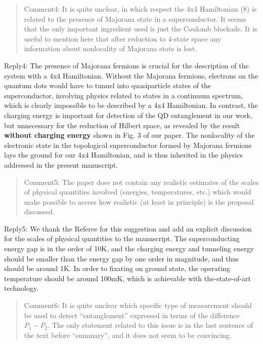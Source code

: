 \documentclass[11pt]{article}
\begin{document}
\begin{quote}
Comment4: It is quite unclear, in which respect the 4x4 Hamiltonian (8)
is related to the presence of Majorana state in a superconductor. It
seems that the only important ingredient used is just the Coulomb
blockade. It is useful to mention here that after reduction to 4-state
space any information about nonlocality of Majorana state is lost.
\end{quote}

Reply4: The presence of Majorana fermions is crucial for the description
of the system with a 4x4 Hamiltonian. Without the Majorana fermions,
electrons on the quantum dots would have to tunnel into quasiparticle
states of the superconductor, involving physics related to states in a
continuum spectrum, which is clearly impossible to be described by a 4x4
Hamiltonian. In contrast, the charging energy is important for detection
of the QD entanglement in our work, but unnecessary for the reduction of
Hilbert space, as revealed by the result
\textbf{without charging energy} shown in Fig. 3 of our paper. The
nonlocality of the electronic state in the topological superconductor
formed by Majorana fermions lays the ground for our 4x4 Hamiltonian, and
is thus inherited in the physics addressed in the present manuscript.

\begin{quote}
Comment5: The paper does not contain any realistic estimates of the
scales of physical quantities involved (energies, temperatures, etc.)
which would make possible to access how realistic (at least in
principle) is the proposal discussed.
\end{quote}

Reply5: We thank the Referee for this suggestion and add an explicit
discussion for the scales of physical quantities to the manuscript. The
superconducting energy gap is in the order of 10K, and the charging
energy and tunneling energy should be smaller than the energy gap by one
order in magnitude, and thus should be around 1K. In order to fixating
on ground state, the operating temperature should be around 100mK, which
is achievable with the-state-of-art technology.

\begin{quote}
Comment6: It is quite unclear which specific type of measurement should
be used to detect ``entanglement'' expressed in terms of the difference
\(P_1-P_2\). The only statement related to this issue is in the last
sentence of the text before ``summary'', and it does not seem to be
convincing.
\end{quote}
\end{document}
